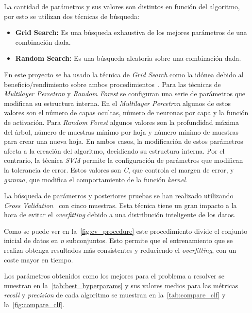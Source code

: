 La cantidad de parámetros y sus valores son distintos en función del algoritmo, por esto se utilizan dos técnicas de búsqueda:

\begin{itemize}
    \item \textbf{Grid Search:} Es una búsqueda exhaustiva de los mejores parámetros de una combinación dada.
    \item \textbf{Random Search:} Es una búsqueda aleatoria sobre una combinación dada.
\end{itemize}


En este proyecto se ha usado la técnica de \textit{Grid Search} como la idónea debido al beneficio/rendimiento sobre ambos procedimientos~\cite{bergstra2012random}.   Para las técnicas de \textit{Multilayer Percetron} y \textit{Random Forest} se configuran una serie de parámetros que modifican su estructura interna. En el \textit{Multilayer Percetron} algunos de estos valores son el número de capas ocultas, número de neuronas por capa y la función de activación. Para \textit{Random Forest} algunos valores son la profundidad máxima del árbol, número de muestras mínimo por hoja  y número mínimo de muestras para crear una nueva hoja. En ambos casos, la modificación de estos parámetros afecta a la creación del algoritmo, decidiendo su estructura interna. Por el contrario, la técnica \textit{SVM} permite la configuración de parámetros que modifican la tolerancia de error. Estos valores son \textit{C}, que controla el margen de error, y \textit{gamma}, que modifica el comportamiento de la función \textit{kernel}. 

La búsqueda de parámetros y posteriores pruebas se han realizado utilizando \textit{Cross Validation}~\cite{kohavi1995study,rao2008dangers} con cinco muestras. Esta técnica tiene un gran impacto a la hora de evitar el \textit{overfitting} debido a una distribución inteligente de los datos.

Como se puede ver en la~\cref{fig:cv_procedure} este procedimiento divide el conjunto inicial de datos en \textit{n} subconjuntos. Esto permite que el entrenamiento que se realiza obtenga resultados más consistentes y reduciendo el \textit{overfitting}, con un coste mayor en tiempo.


Los parámetros obtenidos como los mejores para el problema a resolver se muestran en la~\cref{tab:best_hyperparams} y sus valores medios para las métricas \textit{recall} y \textit{precision} de cada algoritmo se muestran en la~\cref{tab:compare_clf} y la~\cref{fig:compare_clf}.

